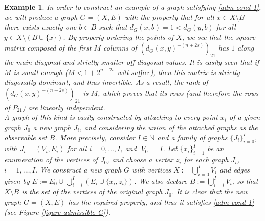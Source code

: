 \documentclass[a4paper,11pt,oneside]{amsart}
\newtheorem{example}[theorem]{Example}
\newcommand{\N}{{\mathbb N}}
\begin{document}
\begin{example}\label{example-admissible-G} \emph{
    In order to construct an example of a graph satisfying \ref{adm-cond-1}, we will produce a graph $G=(X,E)$ with the property that for all $x\in X\setminus B$ there exists exactly one $b\in B$ such that $d_G(x,b) = 1 < d_G(y,b)$ for all $y\in X\setminus (B\cup\{x\})$. By properly ordering the points of $X$, we see that the square matrix composed of the first $M$ columns of $(d_G(x,y)^{-(n+2s)})_{21}$ has $1$ along the main diagonal and strictly smaller off-diagonal values. It is easily seen that if $M$ is small enough ($M< 1+2^{n+2s}$ will suffice), then this matrix is strictly diagonally dominant, and thus invertible. As a result, the rank of $(d_G(x,y)^{-(n+2s)})_{21}$ is $M$, which proves that its rows (and therefore the rows of $P_{21}$) are linearly independent. \\
    A graph of this kind is easily constructed by attaching to every point $x_i$ of a given graph $J_0$ a new graph $J_i$, and considering the union of the attached graphs as the observable set $B$. More precisely, consider $I\in\N$ and a family of graphs $\{J_i\}_{i=0}^{I}$, with $J_i=(V_i,E_i)$ for all $i=0,...,I$, and $|V_0|=I$. Let $\{x_i\}_{i=1}^{I}$ be an enumeration of the vertices of $J_0$, and choose a vertex $z_i$ for each graph $J_i$, $i=1, ..., I$. We construct a new graph $G$ with vertices $X:=\bigcup_{i=0}^{I} V_i$  and edges given by $E:=E_0 \cup \bigcup_{i=i}^{I} (E_i \cup \{x_i, z_i\} )$. We also declare $B:= \bigcup_{i=i}^{I} V_i$, so that $X\setminus B$ is the set of the vertices of the original graph $J_0$. It is clear that the new graph $G=(X,E)$ has the required property, and thus it satisfies \ref{adm-cond-1} (see Figure \ref{figure-admissible-G})}.
\end{example}    
\end{document}
